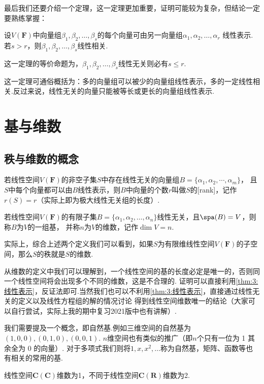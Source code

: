 最后我们还要介绍一个定理，这一定理更加重要，证明可能较为复杂，但结论一定要熟练掌握：
\begin{theorem}\label{thm:3:线性表示}
    设$V(\mathbf{F})$中向量组$ \beta_1,\beta_2,\ldots,\beta_s $的每个向量可由另一向量组$\alpha_1,\alpha_2,\ldots,\alpha_r$
    线性表示.若$s>r$，则$ \beta_1,\beta_2,\ldots,\beta_s $线性相关.
\end{theorem}
这一定理的等价命题为，$ \beta_1,\beta_2,\ldots,\beta_s $线性无关则必有$s\leqslant r$.

这一定理可通俗概括为：多的向量组可以被少的向量组线性表示，多的一定线性相关.反过来说，线性无关的向量只能被等长或更长的向量组线性表示.

\section{基与维数}
\subsection{秩与维数的概念}
\begin{definition}
	若线性空间$V(\mathbf{F})$的非空子集$S$中存在线性无关的向量组$B=\{\alpha_1,\alpha_2,\cdots,\alpha_m\}$，
	且$S$中每个向量都可以由$B$线性表示，则$B$中向量的个数$r$叫做$S$的[rank]，记作$r(S)= r$（实际上即为极大线性无关组的长度）.
\end{definition}
\begin{definition}
    若线性空间$V(\mathbf{F})$的有限子集$B=\{\alpha_1,\alpha_2,\ldots,\alpha_n\}$线性无关，且$\spa(B) = V$，则称$B$为$V$的一组基，
    并称$n$为$V$的维数，记作$\dim V = n$.
\end{definition}
实际上，综合上述两个定义我们可以看到，如果$S$为有限维线性空间$V(\mathbf{F})$的子空间，那么$S$的秩就是$S$的维数.

从维数的定义中我们可以理解到，一个线性空间的基的长度必定是唯一的，否则同一个线性空间将会出现多个不同的维数，这是不合理的.
证明可以直接利用\autoref{thm:3:线性表示}，反证法即可.当然我们也可以不利用\autoref*{thm:3:线性表示}，直接通过线性无关的定义以及线性方程组的解的情况讨论
得到线性空间维数唯一的结论（大家可以自行尝试，实际上我的期中复习2021版中也有讲解）.

我们需要提及一个概念，即自然基.例如三维空间的自然基为$(1,0,0),(0,1,0),(0,0,1)$. $n$维空间也有类似的推广（即$n$个只有一位为 1 其余全为 0 的向量）.
对于多项式我们则将$1,x,x^2,\ldots$称为自然基，矩阵、函数等也有相关的常用的基.

\begin{example}\label{exp:3:不同数域的维数}
    线性空间$\mathbf{C(C)}$维数为1，不同于线性空间$\mathbf{C(R)}$维数为2.
\end{example}
